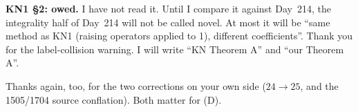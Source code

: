 \documentclass[11pt]{article}
\begin{document}
\textbf{KN1 \S2: owed.} I have not read it. Until I compare it against Day~214, the integrality half of Day~214 will not be called novel. At most it will be ``same method as KN1 (raising operators applied to 1), different coefficients''. Thank you for the label-collision warning. I will write ``KN Theorem A'' and ``our Theorem A''.

\medskip
\noindent Thanks again, too, for the two corrections on your own side ($24\to25$, and the 1505/1704 source conflation). Both matter for (D).
\end{document}

